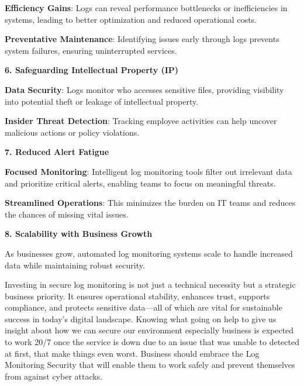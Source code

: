 \textbf{Efficiency Gains}: Logs can reveal performance bottlenecks or inefficiencies in systems, leading to better optimization and reduced operational costs.



\textbf{Preventative Maintenance}: Identifying issues early through logs prevents system failures, ensuring uninterrupted services.


\textbf{6. Safeguarding Intellectual Property (IP)}


\textbf{Data Security}: Logs monitor who accesses sensitive files, providing visibility into potential theft or leakage of intellectual property.



\textbf{Insider Threat Detection}: Tracking employee activities can help uncover malicious actions or policy violations.


\textbf{7. Reduced Alert Fatigue}


\textbf{Focused Monitoring}: Intelligent log monitoring tools filter out irrelevant data and prioritize critical alerts, enabling teams to focus on meaningful threats.



\textbf{Streamlined Operations}: This minimizes the burden on IT teams and reduces the chances of missing vital issues.


\textbf{8. Scalability with Business Growth}

As businesses grow, automated log monitoring systems scale to handle increased data while maintaining robust security.



Investing in secure log monitoring is not just a technical necessity but a strategic business priority. It ensures operational stability, enhances trust, supports compliance, and protects sensitive data—all of which are vital for sustainable success in today’s digital landscape. Knowing what going on help to give us insight about how we can secure our environment especially business is expected to work 20/7 once the service is down due to an issue that was unable to detected at first, that make things even worst. Business should embrace the Log Monitoring Security that will enable them to work safely and prevent themselves from against cyber attacks.




